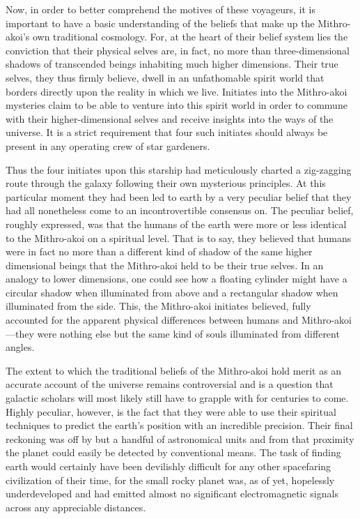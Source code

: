 \documentclass[12pt]{article}
\begin{document}
Now,
in order to better comprehend the motives of these voyageurs,
it is important to have a basic understanding of the beliefs that make up the Mithro-akoi's own traditional cosmology.
For, at the heart of their belief system lies the conviction that their physical selves are, in fact, no more than three-dimensional shadows of transcended beings inhabiting much higher dimensions.
Their true selves, they thus firmly believe, dwell in an unfathomable spirit world that borders directly upon the reality in which we live.
Initiates into the Mithro-akoi mysteries claim to be able to venture into this spirit world in order to commune with their higher-dimensional selves and receive insights into the ways of the universe.
It is a strict requirement that four such initiates should always be present in any operating crew of star gardeners.

Thus the four initiates upon this starship had meticulously charted a zig-zagging route through the galaxy following their own mysterious principles.
At this particular moment they had been led to earth by a very peculiar belief that they had all nonetheless come to an incontrovertible consensus on.
The peculiar belief, roughly expressed, was that the humans of the earth were more or less identical to the Mithro-akoi on a spiritual level.
That is to say, they believed that humans were in fact no more than a different kind of shadow of the same higher dimensional beings that the Mithro-akoi held to be their true selves.
In an analogy to lower dimensions, one could see how a floating cylinder might have a circular shadow when illuminated from above and a rectangular shadow when illuminated from the side.
This, the Mithro-akoi initiates believed, fully accounted for the apparent physical differences between humans and Mithro-akoi---they were nothing else but the same kind of souls illuminated from different angles.

The extent to which the traditional beliefs of the Mithro-akoi hold merit as an accurate account of the universe remains controversial and is a question that galactic scholars will most likely still have to grapple with for centuries to come.
Highly peculiar, however, is the fact that they were able to use their spiritual techniques to predict the earth's position with an incredible precision.
Their final reckoning was off by but a handful of astronomical units and from that proximity the planet could easily be detected by conventional means.
The task of finding earth would certainly have been devilishly difficult for any other spacefaring civilization of their time, 
for the small rocky planet was, as of yet, hopelessly underdeveloped and had emitted almost no significant electromagnetic signals across any appreciable distances.
\end{document}
